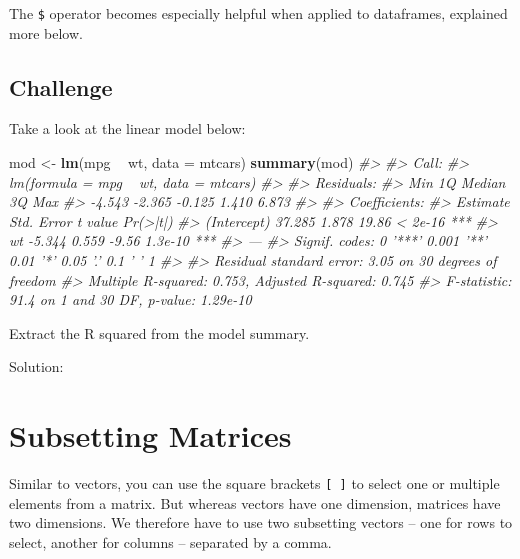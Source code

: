 \documentclass[]{book}
\newenvironment{Shaded}{\begin{snugshade}}{\end{snugshade}}
\newcommand{\KeywordTok}[1]{\textcolor[rgb]{0.13,0.29,0.53}{\textbf{#1}}}
\newcommand{\DataTypeTok}[1]{\textcolor[rgb]{0.13,0.29,0.53}{#1}}
\newcommand{\StringTok}[1]{\textcolor[rgb]{0.31,0.60,0.02}{#1}}
\newcommand{\CommentTok}[1]{\textcolor[rgb]{0.56,0.35,0.01}{\textit{#1}}}
\newcommand{\OperatorTok}[1]{\textcolor[rgb]{0.81,0.36,0.00}{\textbf{#1}}}
\newcommand{\NormalTok}[1]{#1}
\begin{document}
The \texttt{\$} operator becomes especially helpful when applied to
dataframes, explained more below.

\subsection{Challenge}\label{challenge-2}

Take a look at the linear model below:

\begin{Shaded}
\begin{Highlighting}[]
\NormalTok{mod <-}\StringTok{ }\KeywordTok{lm}\NormalTok{(mpg }\OperatorTok{~}\StringTok{ }\NormalTok{wt, }\DataTypeTok{data =}\NormalTok{ mtcars)}
\KeywordTok{summary}\NormalTok{(mod)}
\CommentTok{#> }
\CommentTok{#> Call:}
\CommentTok{#> lm(formula = mpg ~ wt, data = mtcars)}
\CommentTok{#> }
\CommentTok{#> Residuals:}
\CommentTok{#>    Min     1Q Median     3Q    Max }
\CommentTok{#> -4.543 -2.365 -0.125  1.410  6.873 }
\CommentTok{#> }
\CommentTok{#> Coefficients:}
\CommentTok{#>             Estimate Std. Error t value Pr(>|t|)    }
\CommentTok{#> (Intercept)   37.285      1.878   19.86  < 2e-16 ***}
\CommentTok{#> wt            -5.344      0.559   -9.56  1.3e-10 ***}
\CommentTok{#> ---}
\CommentTok{#> Signif. codes:  0 '***' 0.001 '**' 0.01 '*' 0.05 '.' 0.1 ' ' 1}
\CommentTok{#> }
\CommentTok{#> Residual standard error: 3.05 on 30 degrees of freedom}
\CommentTok{#> Multiple R-squared:  0.753,  Adjusted R-squared:  0.745 }
\CommentTok{#> F-statistic: 91.4 on 1 and 30 DF,  p-value: 1.29e-10}
\end{Highlighting}
\end{Shaded}

Extract the R squared from the model summary.

Solution:

\begin{Shaded}
\end{Shaded}

\section{Subsetting Matrices}\label{subsetting-matrices}

Similar to vectors, you can use the square brackets \texttt{{[}\ {]}} to
select one or multiple elements from a matrix. But whereas vectors have
one dimension, matrices have two dimensions. We therefore have to use
two subsetting vectors -- one for rows to select, another for columns --
separated by a comma.
\end{document}
